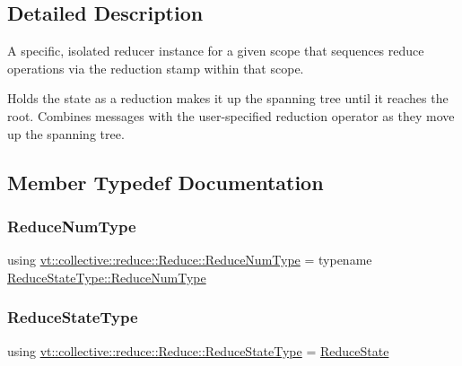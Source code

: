 \subsection{Detailed Description}
A specific, isolated reducer instance for a given scope that sequences reduce operations via the reduction stamp within that scope. 

Holds the state as a reduction makes it up the spanning tree until it reaches the root. Combines messages with the user-\/specified reduction operator as they move up the spanning tree. 

\subsection{Member Typedef Documentation}
\mbox{\label{structvt_1_1collective_1_1reduce_1_1_reduce_a6c3e63aca10c31d2823b0b18cf9762a4}} 
\subsubsection{\texorpdfstring{Reduce\+Num\+Type}{ReduceNumType}}
{\footnotesize\ttfamily using \hyperlink{structvt_1_1collective_1_1reduce_1_1_reduce_a6c3e63aca10c31d2823b0b18cf9762a4}{vt\+::collective\+::reduce\+::\+Reduce\+::\+Reduce\+Num\+Type} =  typename \hyperlink{structvt_1_1collective_1_1reduce_1_1_reduce_state_ae83d217c90b8a8895ca998d7ea9c49e4}{Reduce\+State\+Type\+::\+Reduce\+Num\+Type}}

\mbox{\label{structvt_1_1collective_1_1reduce_1_1_reduce_ab0e89b962f0741718107772505fe6d34}} 
\subsubsection{\texorpdfstring{Reduce\+State\+Type}{ReduceStateType}}
{\footnotesize\ttfamily using \hyperlink{structvt_1_1collective_1_1reduce_1_1_reduce_ab0e89b962f0741718107772505fe6d34}{vt\+::collective\+::reduce\+::\+Reduce\+::\+Reduce\+State\+Type} =  \hyperlink{structvt_1_1collective_1_1reduce_1_1_reduce_state}{Reduce\+State}}



